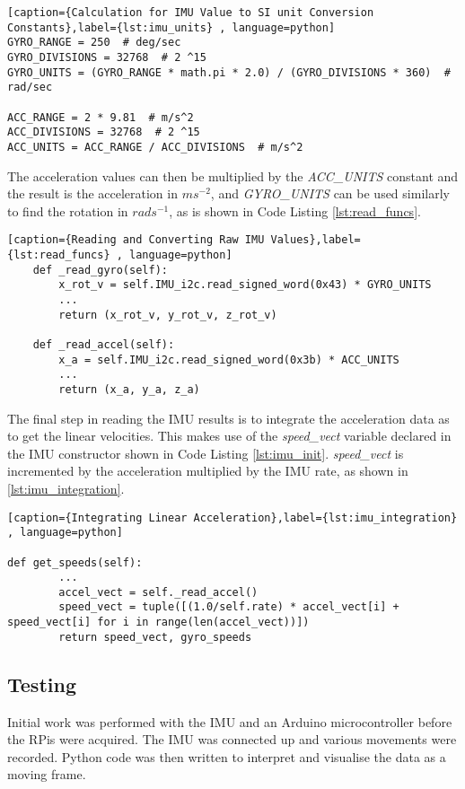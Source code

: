 \begin{lstlisting}[caption={Calculation for IMU Value to SI unit Conversion Constants},label={lst:imu_units} , language=python]
GYRO_RANGE = 250  # deg/sec
GYRO_DIVISIONS = 32768  # 2 ^15
GYRO_UNITS = (GYRO_RANGE * math.pi * 2.0) / (GYRO_DIVISIONS * 360)  # rad/sec

ACC_RANGE = 2 * 9.81  # m/s^2
ACC_DIVISIONS = 32768  # 2 ^15
ACC_UNITS = ACC_RANGE / ACC_DIVISIONS  # m/s^2
\end{lstlisting}

The acceleration values can then be multiplied by the \textit{ACC\_UNITS} constant and the result is the acceleration in $ms^{-2}$, and \textit{GYRO\_UNITS} can be used similarly to find the rotation in $rads^{-1}$, as is shown in Code Listing \ref{lst:read_funcs}. 


\begin{lstlisting}[caption={Reading and Converting Raw IMU Values},label={lst:read_funcs} , language=python]
    def _read_gyro(self):
        x_rot_v = self.IMU_i2c.read_signed_word(0x43) * GYRO_UNITS
		...
        return (x_rot_v, y_rot_v, z_rot_v)

    def _read_accel(self):
        x_a = self.IMU_i2c.read_signed_word(0x3b) * ACC_UNITS
		...
        return (x_a, y_a, z_a)
\end{lstlisting}

The final step in reading the IMU results is to integrate the acceleration data as to get the linear velocities. This makes use of the \textit{speed\_vect} variable declared in the IMU constructor shown in Code Listing \ref{lst:imu_init}. \textit{speed\_vect} is incremented by the acceleration multiplied by the IMU rate, as shown in \ref{lst:imu_integration}.

\begin{lstlisting}[caption={Integrating Linear Acceleration},label={lst:imu_integration} , language=python]

def get_speeds(self):
		...
        accel_vect = self._read_accel()
        speed_vect = tuple([(1.0/self.rate) * accel_vect[i] + speed_vect[i] for i in range(len(accel_vect))])
        return speed_vect, gyro_speeds
\end{lstlisting}


\subsection{Testing}\label{elec/imu/test}
Initial work was performed with the IMU and an Arduino microcontroller before the RPis were acquired. The IMU was connected up and various movements were recorded. Python code was then written to interpret and visualise the data as a moving frame. 


